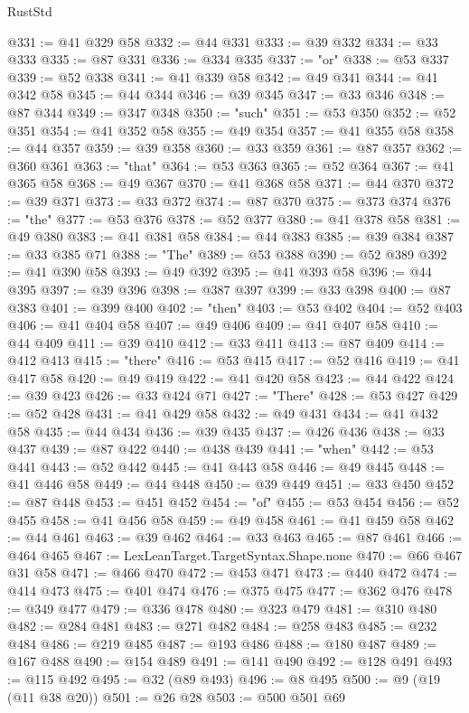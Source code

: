 \begin{lexlean}{RustStd}
\begin{coremodule}
@331 := @41 @329 @58
@332 := @44 @331
@333 := @39 @332
@334 := @33 @333
@335 := @87 @331
@336 := @334 @335
@337 := "or"
@338 := @53 @337
@339 := @52 @338
@341 := @41 @339 @58
@342 := @49 @341
@344 := @41 @342 @58
@345 := @44 @344
@346 := @39 @345
@347 := @33 @346
@348 := @87 @344
@349 := @347 @348
@350 := "such"
@351 := @53 @350
@352 := @52 @351
@354 := @41 @352 @58
@355 := @49 @354
@357 := @41 @355 @58
@358 := @44 @357
@359 := @39 @358
@360 := @33 @359
@361 := @87 @357
@362 := @360 @361
@363 := "that"
@364 := @53 @363
@365 := @52 @364
@367 := @41 @365 @58
@368 := @49 @367
@370 := @41 @368 @58
@371 := @44 @370
@372 := @39 @371
@373 := @33 @372
@374 := @87 @370
@375 := @373 @374
@376 := "the"
@377 := @53 @376
@378 := @52 @377
@380 := @41 @378 @58
@381 := @49 @380
@383 := @41 @381 @58
@384 := @44 @383
@385 := @39 @384
@387 := @33 @385 @71
@388 := "The"
@389 := @53 @388
@390 := @52 @389
@392 := @41 @390 @58
@393 := @49 @392
@395 := @41 @393 @58
@396 := @44 @395
@397 := @39 @396
@398 := @387 @397
@399 := @33 @398
@400 := @87 @383
@401 := @399 @400
@402 := "then"
@403 := @53 @402
@404 := @52 @403
@406 := @41 @404 @58
@407 := @49 @406
@409 := @41 @407 @58
@410 := @44 @409
@411 := @39 @410
@412 := @33 @411
@413 := @87 @409
@414 := @412 @413
@415 := "there"
@416 := @53 @415
@417 := @52 @416
@419 := @41 @417 @58
@420 := @49 @419
@422 := @41 @420 @58
@423 := @44 @422
@424 := @39 @423
@426 := @33 @424 @71
@427 := "There"
@428 := @53 @427
@429 := @52 @428
@431 := @41 @429 @58
@432 := @49 @431
@434 := @41 @432 @58
@435 := @44 @434
@436 := @39 @435
@437 := @426 @436
@438 := @33 @437
@439 := @87 @422
@440 := @438 @439
@441 := "when"
@442 := @53 @441
@443 := @52 @442
@445 := @41 @443 @58
@446 := @49 @445
@448 := @41 @446 @58
@449 := @44 @448
@450 := @39 @449
@451 := @33 @450
@452 := @87 @448
@453 := @451 @452
@454 := "of"
@455 := @53 @454
@456 := @52 @455
@458 := @41 @456 @58
@459 := @49 @458
@461 := @41 @459 @58
@462 := @44 @461
@463 := @39 @462
@464 := @33 @463
@465 := @87 @461
@466 := @464 @465
@467 := LexLeanTarget.TargetSyntax.Shape.none
@470 := @66 @467 @31 @58
@471 := @466 @470
@472 := @453 @471
@473 := @440 @472
@474 := @414 @473
@475 := @401 @474
@476 := @375 @475
@477 := @362 @476
@478 := @349 @477
@479 := @336 @478
@480 := @323 @479
@481 := @310 @480
@482 := @284 @481
@483 := @271 @482
@484 := @258 @483
@485 := @232 @484
@486 := @219 @485
@487 := @193 @486
@488 := @180 @487
@489 := @167 @488
@490 := @154 @489
@491 := @141 @490
@492 := @128 @491
@493 := @115 @492
@495 := @32 (@89 @493)
@496 := @8 @495
@500 := @9 (@19 (@11 @38 @20))
@501 := @26 @28
@503 := @500 @501 @69

\end{coremodule}
\end{lexlean}
